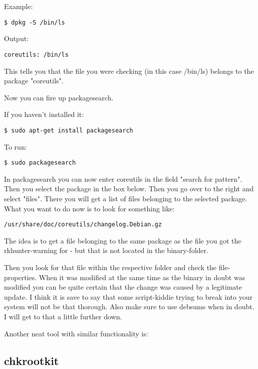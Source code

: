 \documentclass{article}
\begin{document}
 Example:
\begin{lstlisting}
$ dpkg -S /bin/ls
\end{lstlisting}



 Output:
\begin{lstlisting}
coreutils: /bin/ls
\end{lstlisting}



 This tells you that the file you were checking (in this case /bin/ls) belongs to the package "coreutils".


 Now you can fire up packagesearch.


 If you haven't installed it:
\begin{lstlisting}
$ sudo apt-get install packagesearch
\end{lstlisting}



 To run:
\begin{lstlisting}
$ sudo packagesearch
\end{lstlisting}



 In packagesearch you can now enter coreutils in the field "search for pattern". Then you select the package in the box below. Then you go over to the right and select "files". There you will get a list of files belonging to the selected package. What you want to do now is to look for something like:
\begin{lstlisting}
/usr/share/doc/coreutils/changelog.Debian.gz
\end{lstlisting}



 The idea is to get a file belonging to the same package as the file you got the rkhunter-warning for - but that is not located in the binary-folder. 


 Then you look for that file within the respective folder and check the file-properties. When it was modified at the same time as the binary in doubt was modified you can be quite certain that the change was caused by a legitimate update. I think it is save to say that some script-kiddie trying to break into your system will not be that thorough. Also make sure to use debsums when in doubt. I will get to that a little further down.


 Another neat tool with similar functionality is:
\subsection{chkrootkit}
\end{document}
